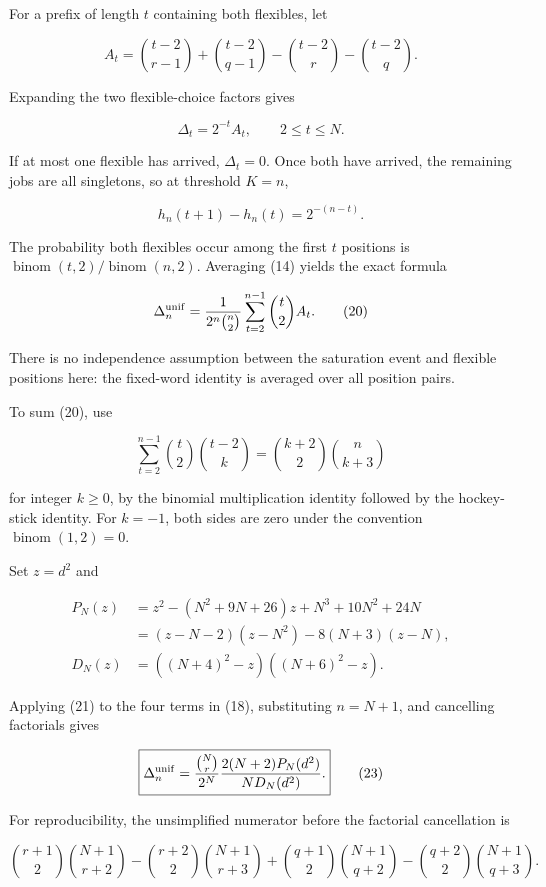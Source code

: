 For a prefix of length \(t\) containing both flexibles, let

\[
A_t=\binom{t-2}{r-1}+\binom{t-2}{q-1}
    -\binom{t-2}{r}-\binom{t-2}{q}.\tag{18}
\]

Expanding the two flexible-choice factors gives

\[
\Delta_t=2^{-t}A_t,\qquad 2\le t\le N.\tag{19}
\]

If at most one flexible has arrived, \(\Delta_t=0\). Once both have arrived, the remaining jobs are all singletons, so at threshold \(K=n\),

\[
h_n(t+1)-h_n(t)=2^{-(n-t)}.
\]

The probability both flexibles occur among the first \(t\) positions is \(\operatorname{binom}(t,2)/\operatorname{binom}(n,2)\). Averaging (14) yields the exact formula

\[
\Delta^{\rm unif}_{n}
=
\frac{1}{2^n\binom n2}
\sum_{t=2}^{n-1}\binom t2 A_t.\tag{20}
\]

There is no independence assumption between the saturation event and flexible positions here: the fixed-word identity is averaged over all position pairs.

To sum (20), use

\[
\sum_{t=2}^{n-1}\binom t2\binom{t-2}{k}
=
\binom{k+2}{2}\binom n{k+3}\tag{21}
\]

for integer \(k\ge 0\), by the binomial multiplication identity followed by the hockey-stick identity. For \(k=-1\), both sides are zero under the convention \(\operatorname{binom}(1,2)=0\).

Set \(z=d^2\) and

\[
\begin{aligned}
P_N(z)
&=z^2-(N^2+9N+26)z+N^3+10N^2+24N\\
&=(z-N-2)(z-N^2)-8(N+3)(z-N),\\
D_N(z)&=((N+4)^2-z)((N+6)^2-z).
\end{aligned}\tag{22}
\]

Applying (21) to the four terms in (18), substituting \(n=N+1\), and cancelling factorials gives

\[
\boxed{
\Delta^{\rm unif}_{n}
=
\frac{\binom Nr}{2^N}
\frac{2(N+2)P_N(d^2)}{N D_N(d^2)}.
}\tag{23}
\]

For reproducibility, the unsimplified numerator before the factorial cancellation is

\[
\binom{r+1}{2}\binom{N+1}{r+2}
-\binom{r+2}{2}\binom{N+1}{r+3}
+\binom{q+1}{2}\binom{N+1}{q+2}
-\binom{q+2}{2}\binom{N+1}{q+3}.
\tag{24}
\]


